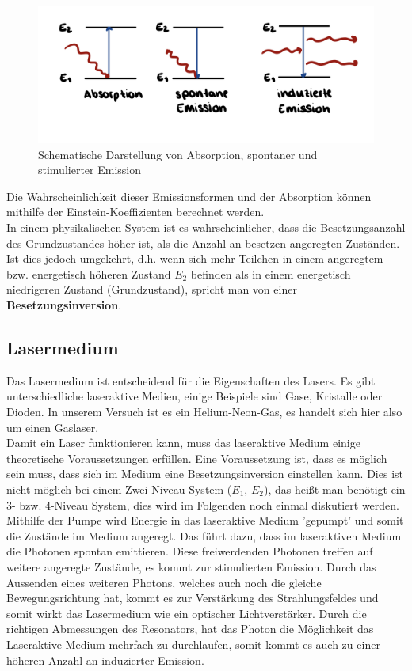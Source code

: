 \begin{figure}[h]
    \centering
    \includegraphics[scale=0.17]{Bilder/FzV/Emission.jpg}
    \caption{Schematische Darstellung von Absorption, spontaner und stimulierter Emission}
\end{figure}
\newpage
Die Wahrscheinlichkeit dieser Emissionsformen und der Absorption können mithilfe der Einstein-Koeffizienten berechnet werden.\\ 
In einem physikalischen System ist es wahrscheinlicher, dass die Besetzungsanzahl des Grundzustandes höher ist, als die Anzahl an 
besetzen angeregten Zuständen. Ist dies jedoch umgekehrt, d.h. wenn sich mehr Teilchen in einem angeregtem bzw. 
energetisch höheren Zustand $E_2$ befinden als in einem energetisch niedrigeren Zustand (Grundzustand), 
spricht man von einer \textbf{Besetzungsinversion}. \cite[vgl.][]{laser1,laser2}


\subsection{Lasermedium}
Das Lasermedium ist entscheidend für die Eigenschaften des Lasers. Es gibt unterschiedliche laseraktive Medien, 
einige Beispiele sind Gase, Kristalle oder Dioden.
In unserem Versuch ist es ein Helium-Neon-Gas, es handelt 
sich hier also um einen Gaslaser.\\
Damit ein Laser funktionieren kann, muss das laseraktive Medium einige theoretische
Voraussetzungen erfüllen. Eine Voraussetzung ist, dass es möglich sein 
muss, dass sich im Medium eine Besetzungsinversion einstellen kann.
Dies ist nicht möglich bei einem Zwei-Niveau-System ($E_1$, $E_2$), das heißt man benötigt ein 3- bzw. 4-Niveau System, dies wird im Folgenden noch einmal diskutiert werden.\\
Mithilfe der Pumpe wird Energie in das laseraktive Medium 'gepumpt' und somit die Zustände im Medium angeregt. 
Das führt dazu, dass im laseraktiven Medium die Photonen spontan emittieren.
Diese freiwerdenden Photonen
treffen auf weitere angeregte Zustände, es kommt zur stimulierten Emission. Durch 
das Aussenden eines weiteren Photons, welches auch noch die gleiche Bewegungsrichtung hat, kommt es zur Verstärkung des 
Strahlungsfeldes und somit wirkt das Lasermedium wie ein optischer 
Lichtverstärker. Durch die richtigen Abmessungen des Resonators, hat das Photon die Möglichkeit das Laseraktive Medium
mehrfach zu durchlaufen, somit kommt es auch zu einer höheren Anzahl an induzierter Emission. \citep[vgl.][]{laser}


